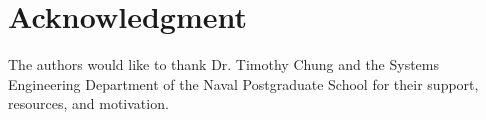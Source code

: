 \documentclass[10pt]{./IEEEtran}
\begin{document}





\section*{Acknowledgment}
%
%
The authors would like to thank Dr. Timothy Chung and the Systems Engineering Department of the Naval Postgraduate School for their support, resources, and motivation.









%
%




\end{document}
